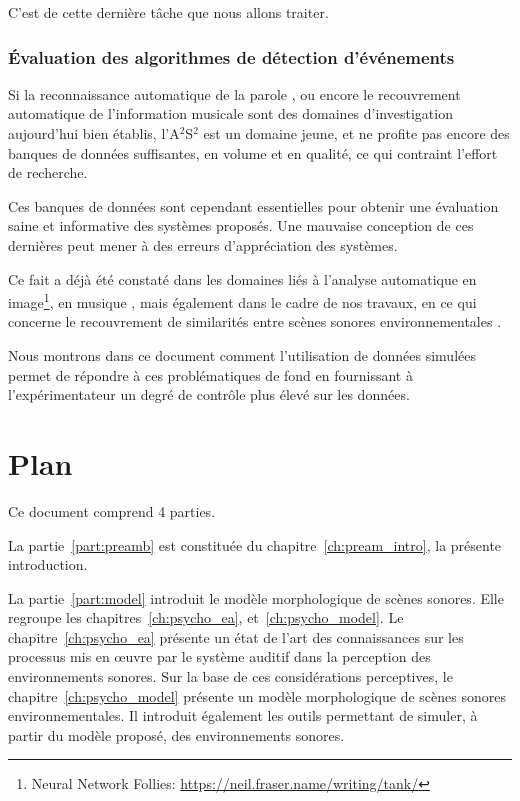 C'est de cette dernière tâche que nous allons traiter.

\subsubsection{Évaluation des algorithmes de détection d'événements}

Si la reconnaissance automatique de la parole \citep{Rabiner93}, ou encore le recouvrement automatique de l'information musicale \citep{Muller07} sont des domaines d'investigation aujourd'hui bien établis, l'A$^2$S$^2$ est un domaine jeune, et ne profite pas encore des banques de données suffisantes, en volume et en qualité, ce qui contraint l'effort de recherche.

Ces banques de données sont cependant essentielles pour obtenir une évaluation saine et informative des systèmes proposés. Une mauvaise conception de ces dernières peut mener à des erreurs d’appréciation des systèmes. 

Ce fait a déjà été constaté dans les domaines liés à l’analyse automatique en image\footnote{Neural Network Follies: \url{https://neil.fraser.name/writing/tank/}}, en musique \citep{sturm2014simple}, mais également dans le cadre de nos travaux, en ce qui concerne le recouvrement de similarités entre scènes sonores environnementales \citep{lafay2016JAES}.

Nous montrons dans ce document comment l'utilisation de données simulées permet de répondre à ces problématiques de fond en fournissant à l'expérimentateur un degré de contrôle plus élevé sur les données.




\section{Plan}

Ce document comprend 4 parties.

La partie~\ref{part:preamb} est constituée du chapitre~\ref{ch:pream_intro}, la présente introduction.

La partie~\ref{part:model} introduit le modèle morphologique de scènes sonores. Elle regroupe les chapitres~\ref{ch:psycho_ea}, et~\ref{ch:psycho_model}. Le chapitre~\ref{ch:psycho_ea} présente un état de l'art des connaissances sur les processus mis en œuvre par le système auditif dans la perception des environnements sonores. Sur la base de ces considérations perceptives, le chapitre~\ref{ch:psycho_model} présente un modèle morphologique de scènes sonores environnementales. Il introduit également les outils permettant de simuler, à partir du modèle proposé, des environnements sonores.

